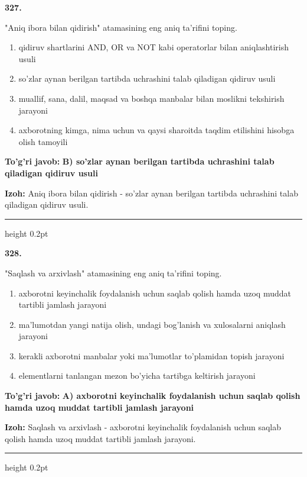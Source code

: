 \documentclass[10pt,a4paper,oneside]{article}
\begin{document}
\noindent\textbf{\color{ink}327.}
\par
"Aniq ibora bilan qidirish" atamasining eng aniq ta'rifini toping.
\begin{enumerate}[label=\Alph*),leftmargin=9mm]
\item qidiruv shartlarini AND, OR va NOT kabi operatorlar bilan aniqlashtirish usuli
\item so'zlar aynan berilgan tartibda uchrashini talab qiladigan qidiruv usuli
\item muallif, sana, dalil, maqsad va boshqa manbalar bilan moslikni tekshirish jarayoni
\item axborotning kimga, nima uchun va qaysi sharoitda taqdim etilishini hisobga olish tamoyili
\end{enumerate}
\begin{tcolorbox}[enhanced,breakable,colback=teal!4,colframe=teal!50!black,boxrule=0.5pt,arc=1.1mm,left=3mm,right=3mm,top=1.7mm,bottom=1.7mm,before skip=2mm,after skip=2mm]
\textbf{\color{teal}To'g'ri javob:} \textbf{B) so'zlar aynan berilgan tartibda uchrashini talab qiladigan qidiruv usuli}
\par\smallskip
\textbf{Izoh:} Aniq ibora bilan qidirish - so'zlar aynan berilgan tartibda uchrashini talab qiladigan qidiruv usuli.
\end{tcolorbox}
\vspace{2mm}\hrule height 0.2pt \vspace{3mm}

\noindent\textbf{\color{ink}328.}
\par
"Saqlash va arxivlash" atamasining eng aniq ta'rifini toping.
\begin{enumerate}[label=\Alph*),leftmargin=9mm]
\item axborotni keyinchalik foydalanish uchun saqlab qolish hamda uzoq muddat tartibli jamlash jarayoni
\item ma'lumotdan yangi natija olish, undagi bog'lanish va xulosalarni aniqlash jarayoni
\item kerakli axborotni manbalar yoki ma'lumotlar to'plamidan topish jarayoni
\item elementlarni tanlangan mezon bo'yicha tartibga keltirish jarayoni
\end{enumerate}
\begin{tcolorbox}[enhanced,breakable,colback=teal!4,colframe=teal!50!black,boxrule=0.5pt,arc=1.1mm,left=3mm,right=3mm,top=1.7mm,bottom=1.7mm,before skip=2mm,after skip=2mm]
\textbf{\color{teal}To'g'ri javob:} \textbf{A) axborotni keyinchalik foydalanish uchun saqlab qolish hamda uzoq muddat tartibli jamlash jarayoni}
\par\smallskip
\textbf{Izoh:} Saqlash va arxivlash - axborotni keyinchalik foydalanish uchun saqlab qolish hamda uzoq muddat tartibli jamlash jarayoni.
\end{tcolorbox}
\vspace{2mm}\hrule height 0.2pt \vspace{3mm}
\end{document}
